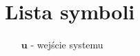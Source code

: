 \chapter*{Lista symboli}

\begin{itemize}[noitemsep,topsep=0pt,parsep=0pt,partopsep=0pt,labelwidth=1cm,align=left,itemindent=0pt]
\item[$\mathbf{u}$] - wejście systemu
\end{itemize}